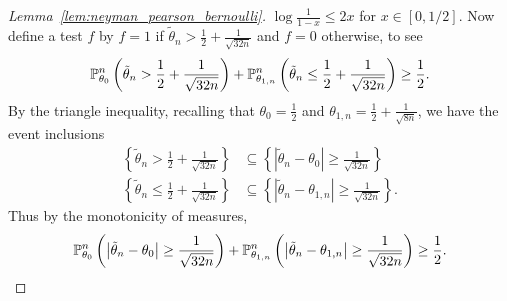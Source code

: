 \begin{proof}[Lemma~\ref{lem:neyman_pearson_bernoulli}]
  $\log \frac{1}{1-x} \leq 2x$
  for $x \in [0,1/2]$.
  Now define a test $f$ by
  $f = 1$ if $\tilde \theta_n > \frac{1}{2} + \frac{1}{\sqrt{32n}}$
  and $f=0$ otherwise,
  to see
  \begin{align*}
    \P_{\theta_0}^n \left(
      \tilde \theta_n > \frac{1}{2} + \frac{1}{\sqrt{32n}}
    \right)
    + \P_{\theta_{1,n}}^n \left(
      \tilde \theta_n \leq \frac{1}{2} + \frac{1}{\sqrt{32n}}
    \right)
    \geq \frac{1}{2}.
  \end{align*}
  By the triangle inequality,
  recalling that
  $\theta_0 = \frac{1}{2}$
  and $\theta_{1,n} = \frac{1}{2} + \frac{1}{\sqrt{8n}}$,
  we have the event inclusions
  \begin{align*}
    \left\{
      \tilde \theta_n > \frac{1}{2} + \frac{1}{\sqrt{32n}}
    \right\}
    &\subseteq
    \left\{
      \left| \tilde \theta_n - \theta_0 \right|
      \geq \frac{1}{\sqrt{32n}}
    \right\} \\
    \left\{
      \tilde \theta_n \leq \frac{1}{2} + \frac{1}{\sqrt{32n}}
    \right\}
    &\subseteq
    \left\{
      \left| \tilde \theta_n - \theta_{1,n} \right|
      \geq \frac{1}{\sqrt{32n}}
    \right\}.
  \end{align*}
  Thus by the monotonicity of measures,
  \begin{align*}
    \P_{\theta_0}^n \left(
      \big| \tilde \theta_n - \theta_0 \big|
      \geq \frac{1}{\sqrt{32n}}
    \right)
    + \P_{\theta_{1,n}}^n \left(
      \big| \tilde \theta_n - \theta_{1,n} \big|
      \geq \frac{1}{\sqrt{32n}}
    \right)
    \geq \frac{1}{2}.
  \end{align*}
\end{proof}

